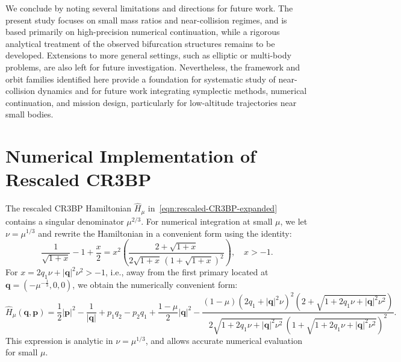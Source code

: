 \documentclass[pdflatex,sn-mathphys-ay]{sn-jnl}%
\theoremstyle{thmstyleone}%
\theoremstyle{thmstyletwo}%
\theoremstyle{thmstylethree}%
\begin{document}
We conclude by noting several limitations and directions for future work. 
The present study focuses on small mass ratios and near-collision regimes, and is based primarily on high-precision numerical continuation, while a rigorous analytical treatment of the observed bifurcation structures remains to be developed. Extensions to more general settings, such as elliptic or multi-body problems, are also left for future investigation. Nevertheless, the framework and orbit families identified here provide a foundation for systematic study of near-collision dynamics and for future work integrating symplectic methods, numerical continuation, and mission design, particularly for low-altitude trajectories near small bodies.

\appendix
\section{Numerical Implementation of Rescaled CR3BP}
\label{sec:appendix_rescaled_ham}
The rescaled CR3BP Hamiltonian $\hat{H}_\mu$ in~\eqref{eqn:rescaled-CR3BP-expanded} contains a singular denominator $\mu^{2/3}$. 
For numerical integration at small $\mu$, we let $\nu = \mu^{1/3}$ and rewrite the Hamiltonian in a convenient form using the identity:
\[
\frac{1}{\sqrt{1 + x}} - 1 + \frac{x}{2} = x^2 \left( \frac{2 + \sqrt{1 + x}}{2\sqrt{1 + x} \, (1 + \sqrt{1 + x})^2} \right), \quad x > -1.
\]
For $x = 2q_1 \nu + |\mathbf{q}|^2 \nu^2 > -1$, i.e., away from the first primary located at $\mathbf{q} = (-\mu^{-\frac{1}{3}}, 0, 0)$, we obtain the numerically convenient form:
\begin{equation*}
    \hat{H}_\mu(\mathbf{q},\mathbf{p}) = \frac{1}{2}|\mathbf{p}|^2 - \frac{1}{|\mathbf{q}|} + p_1q_2 - p_2q_1 
    + \frac{1-\mu}{2}|\mathbf{q}|^2
    - \frac{(1-\mu) (2q_1 + |\mathbf{q}|^2\nu)^2 (2 + \sqrt{1 + 2q_1\nu + |\mathbf{q}|^2\nu^2})}{2\sqrt{1 + 2q_1\nu + |\mathbf{q}|^2\nu^2} \, (1 + \sqrt{1 + 2q_1\nu + |\mathbf{q}|^2\nu^2})^2}
    .
\end{equation*}
This expression is analytic in $\nu = \mu^{1/3}$, and allows accurate numerical evaluation for small $\mu$.
\end{document}
